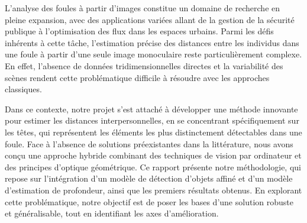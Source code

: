  

L’analyse des foules à partir d’images constitue un domaine de recherche en pleine expansion, avec des applications variées allant de la gestion de la sécurité publique à l’optimisation des flux dans les espaces urbains. Parmi les défis inhérents à cette tâche, l’estimation précise des distances entre les individus dans une foule à partir d’une seule image monoculaire reste particulièrement complexe. En effet, l’absence de données tridimensionnelles directes et la variabilité des scènes rendent cette problématique difficile à résoudre avec les approches classiques. 

Dans ce contexte, notre projet s’est attaché à développer une méthode innovante pour estimer les distances interpersonnelles, en se concentrant spécifiquement sur les têtes, qui représentent les éléments les plus distinctement détectables dans une foule. Face à l’absence de solutions préexistantes dans la littérature, nous avons conçu une approche hybride combinant des techniques de vision par ordinateur et des principes d’optique géométrique. Ce rapport présente notre méthodologie, qui repose sur l’intégration d’un modèle de détection d’objets affiné et d’un modèle d’estimation de profondeur, ainsi que les premiers résultats obtenus. En explorant cette problématique, notre objectif est de poser les bases d’une solution robuste et généralisable, tout en identifiant les axes d’amélioration.
